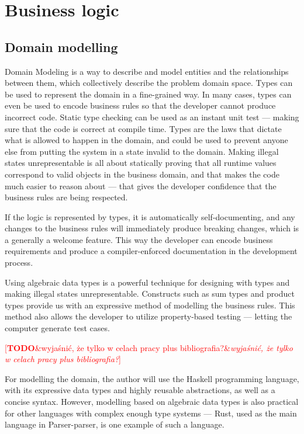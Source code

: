 \documentclass[english,bachelors,forcepolishlogotype]{wizthesis}
\newcommand{\todo}[1]{%
  \textcolor{red}{[\textbf{TODO}\ifx&#1&{}\else{ }\fi\emph{#1}]}%
}
\newcommand{\paraphrase}[1]{#1}
\newcommand{\thisproject}{Parser-parser}
\begin{document}
\section{Business logic} \label{sec:business-logic}

\subsection{Domain modelling} \label{sbs:domain-modelling}

\paraphrase{Domain Modeling is a way to describe and model entities and the
relationships between them, which collectively describe the problem domain
space. Types can be used to represent the domain in a fine-grained way. In many
cases, types can even be used to encode business rules so that the developer
cannot produce incorrect code. Static type checking can be used as an instant
unit test --- making sure that the code is correct at compile time. Types are
the laws that dictate what is allowed to happen in the domain, and could be used
to prevent anyone else from putting the system in a state invalid to the domain.
Making illegal states unrepresentable is all about statically proving that all
runtime values correspond to valid objects in the business domain, and that
makes the code much easier to reason about --- that gives the developer
confidence that the business rules are being respected.}

\paraphrase{If the logic is represented by types, it is automatically
self-documenting, and any changes to the business rules will immediately produce
breaking changes, which is a generally a welcome feature. This way the developer
can encode business requirements and produce a compiler-enforced documentation in
the development process.}

Using algebraic data types is a powerful technique for designing with types and
making illegal states unrepresentable. Constructs such as sum types and product
types provide us with an expressive method of modelling the business rules.
This method also allows the developer to utilize property-based testing ---
letting the computer generate test cases.

\todo{wyjaśnić, że tylko w celach pracy plus bibliografia?}

For modelling the domain, the author will use the Haskell programming language,
with its expressive data types and highly reusable abstractions, as well as a
concise syntax. However, modelling based on algebraic data types is also
practical for other languages with complex enough type systems --- Rust, used as
the main language in \thisproject{}, is one example of such a language.
\end{document}
